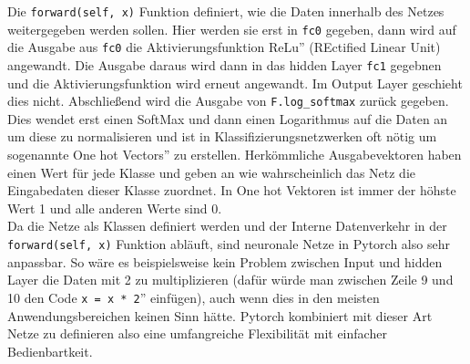\documentclass[11pt]{article}
\begin{document}
Die \texttt{forward(self, x)} Funktion definiert, wie die Daten innerhalb des Netzes weitergegeben werden sollen. Hier werden sie erst in \texttt{fc0} gegeben, dann wird auf die Ausgabe aus \texttt{fc0} die Aktivierungsfunktion \glqq ReLu'' (REctified Linear Unit) angewandt. Die Ausgabe daraus wird dann in das hidden Layer \texttt{fc1} gegebnen und die Aktivierungsfunktion wird erneut angewandt. Im Output Layer geschieht dies nicht. Abschließend wird die Ausgabe von \texttt{F.log_softmax} zurück gegeben. Dies wendet erst einen SoftMax und dann einen Logarithmus auf die Daten an \cite{6} um diese zu normalisieren und ist in Klassifizierungsnetzwerken oft nötig um sogenannte \glqq One hot Vectors'' zu erstellen. Herkömmliche Ausgabevektoren haben einen Wert für jede Klasse und geben an wie wahrscheinlich das Netz die Eingabedaten dieser Klasse zuordnet. In One hot Vektoren ist immer der höhste Wert 1 und alle anderen Werte sind 0.\\
Da die Netze als Klassen definiert werden und der Interne Datenverkehr in der\\ \texttt{forward(self, x)} Funktion abläuft, sind neuronale Netze in Pytorch also sehr anpassbar. So wäre es beispielsweise kein Problem zwischen Input und hidden Layer die Daten mit 2 zu multiplizieren (dafür würde man zwischen Zeile 9 und 10 den Code \glqq\texttt{x = x * 2}'' einfügen), auch wenn dies in den meisten Anwendungsbereichen keinen Sinn hätte. Pytorch kombiniert mit dieser Art Netze zu definieren also eine umfangreiche Flexibilität mit einfacher Bedienbartkeit.
\end{document}
